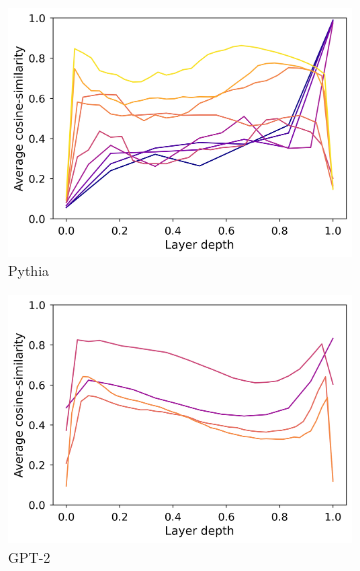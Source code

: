 \begin{figure}[h]
    \centering
    \begin{subfigure}{0.33\columnwidth}
         \includegraphics[width=\linewidth]{sources/part_1/softmax_bottleneck/imgs/pythia_anisotropy.png}
         \caption{Pythia}
         \label{fig:pythia_aniso}
    \end{subfigure}
    \begin{subfigure}{0.33\columnwidth}
         \includegraphics[width=\linewidth]{sources/part_1/softmax_bottleneck/imgs/gpt2_anisotropy.png}
         \caption{GPT-2}
         \label{fig:gpt2_aniso}
    \end{subfigure}
    \begin{subfigure}{0.33\columnwidth}

\end{subfigure}
\end{figure}
